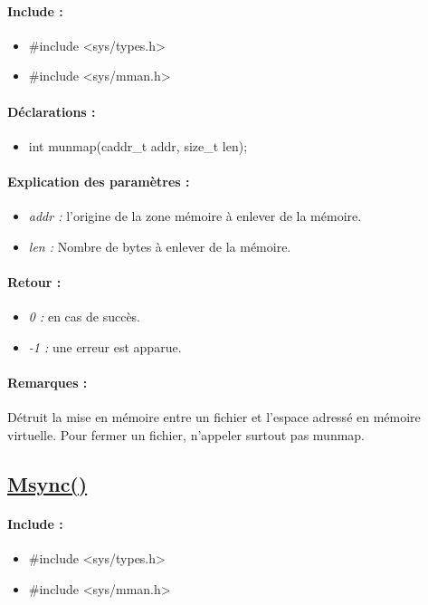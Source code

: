 \documentclass{article}[12pt]
\begin{document}
\paragraph{Include : }
\begin{itemize}
	\item \#include <sys/types.h>
	\item \#include <sys/mman.h>
\end{itemize}
\paragraph{Déclarations : }
\begin{itemize}
	\item int munmap(caddr\_t addr, size\_t len);
\end{itemize}
\paragraph{Explication des paramètres : }
\begin{itemize}
	\item \emph{addr : } l'origine de la zone mémoire à enlever de la mémoire.
	\item \emph{len : } Nombre de bytes à enlever de la mémoire.
\end{itemize}
\paragraph{Retour : }
\begin{itemize}
	\item \emph{0 : } en cas de succès.
	\item \emph{-1 : } une erreur est apparue.
\end{itemize}
\paragraph{Remarques : }
Détruit la mise en mémoire entre un fichier et l'espace adressé en mémoire virtuelle. Pour fermer un fichier, n'appeler surtout pas munmap. 
\subsection{\href{http://jp.barralis.com/linux-man/man2/msync.2.php}{Msync()}}
\paragraph{Include : }
\begin{itemize}
	\item \#include <sys/types.h>
	\item \#include <sys/mman.h>
\end{itemize}
\end{document}
